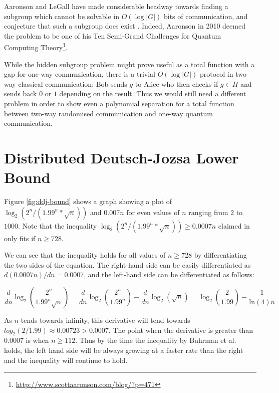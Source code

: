 \documentclass[a4paper]{article}
\begin{document}
        Aaronson and LeGall have made considerable headway towards finding a subgroup which cannot be solvable in $O(\log |G|)$ bits of communication, and conjecture that such a subgroup does exist \cite{0902.3175}. Indeed, Aaronson in 2010 deemed the problem to be one of his Ten Semi-Grand Challenges for Quantum Computing Theory\footnote{\url{http://www.scottaaronson.com/blog/?p=471}}.

        While the hidden subgroup problem might prove useful as a total function with a gap for one-way communication, there is a trivial $O(\log|G|)$ protocol in two-way classical communication: Bob sends $g$ to Alice who then checks if $g \in H$ and sends back $0$ or $1$ depending on the result. Thus we would still need a different problem in order to show even a polynomial separation for a total function between two-way randomised communication and one-way quantum communication.

    
    {}

    \appendix
    \section{Distributed Deutsch-Jozsa Lower Bound}
    \label{sec:ddj-lower-bound}

        Figure \ref{fig:ddj-bound} shows a graph showing a plot of $\log_2(2^n/(1.99^n*\sqrt{n}))$ and $0.007n$ for even values of $n$ ranging from $2$ to $1000$. Note that the inequality $\log_2(2^n/(1.99^n*\sqrt{n})) \geq 0.0007n$ claimed in \cite{RevModPhys.82.665} only fits if $n \geq 728$.

        We can see that the inequality holds for all values of $n \geq 728$ by differentiating the two sides of the equation. The right-hand side can be easily differentiated as $d(0.0007n)/dn = 0.0007$, and the left-hand side can be differentiated as follows:

        $$\frac{d}{dn}\log_2\left(\frac{2^n}{1.99^n\sqrt{n}}\right) = \frac{d}{dn}\log_2\left(\frac{2^n}{1.99^n}\right) - \frac{d}{dn}\log_2(\sqrt{n}) = \log_2\left(\frac{2}{1.99}\right) - \frac{1}{\textrm{ln}(4)n}$$

        As $n$ tends towards infinity, this derivative will tend towards $log_2(2/1.99) \approx 0.00723 > 0.0007$. The point when the derivative is greater than 0.0007 is when $n \geq 112$. Thus by the time the inequality by Buhrman et al.~ holds, the left hand side will be always growing at a faster rate than the right and the inequality will continue to hold.
\end{document}
